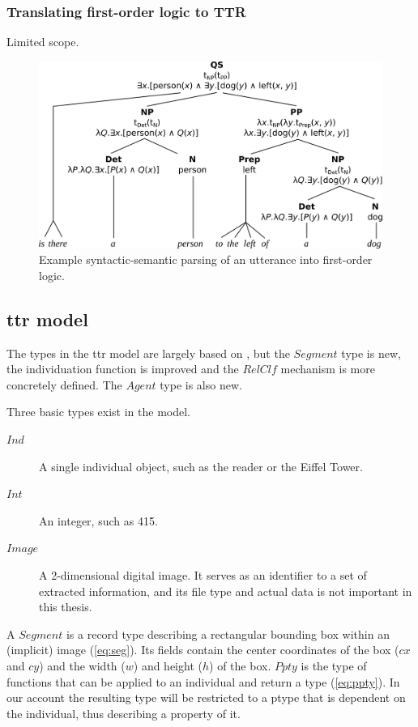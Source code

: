 \subsubsection{Translating first-order logic to TTR}

Limited scope.

\begin{figure}[h]
\label{fig:tree}
\includegraphics[width=\textwidth]{tree}
\centering
\caption{Example syntactic-semantic parsing of an utterance into first-order logic.}
\end{figure}



\subsection{\Acrshort{ttr} model}
\label{ssec:ttrmodel}

The types in the \gls{ttr} model are largely based on \cite{lspc}, but the $Segment$ type is new, the individuation function is improved and the $RelClf$ mechanism is more concretely defined.
The $Agent$ type is also new.

Three basic types exist in the model.

\begin{description}
\item [$Ind$] A single individual object, such as the reader or the Eiffel Tower.
\item [$Int$] An integer, such as 415.
\item [$Image$] A 2-dimensional digital image. It serves as an identifier to a set of extracted information, and its file type and actual data is not important in this thesis.
\end{description}

A $Segment$ is a record type describing a rectangular bounding box within an (implicit) image (\autoref{eq:seg}).
Its fields contain the center coordinates of the box ($cx$ and $cy$) and the width ($w$) and height ($h$) of the box.
$Ppty$ is the type of functions that can be applied to an individual and return a type (\autoref{eq:ppty}).
In our account the resulting type will be restricted to a ptype that is dependent on the individual, thus describing a property of it.

